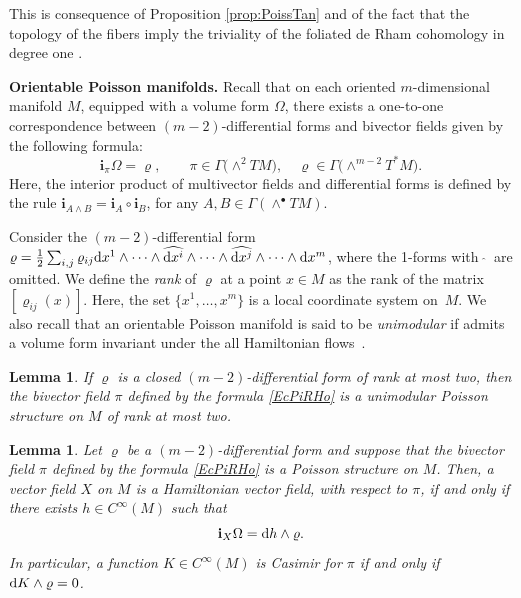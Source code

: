 \documentclass[pdftex]{sigma}%
\newcommand{\dd}{{\rm d}}
\newcommand{\ii}{\mathbf{i}}
\numberwithin{equation}{section}
\newtheorem{Lemma}[Theorem]{Lemma}
\begin{document}
This is consequence of Proposition \ref{prop:PoissTan} and of the fact that the topology of the fibers imply the triviality of the foliated de Rham cohomology in degree one \cite[Proposition~7.4]{DazHec-91}.

{\bf Orientable Poisson manifolds.} Recall that on each oriented $m$-dimensional manifold $M$, equipped with a volume form $\Omega$, there exists a one-to-one correspondence between $(m-2)$-differential forms and bivector fields given by the following formula:
 \begin{equation}\label{EcPiRHo}
 \ii_{\pi}\Omega = \varrho, \qquad \pi \in \Gamma\big({\wedge}^{2}TM\big),\quad \varrho \in \Gamma\big({\wedge}^{m-2}T^{\ast}M\big).
 \end{equation}
Here, the interior product of multivector fields and differential forms is defined by the rule $\ii_{A \wedge B} = \ii_{A} \circ \ii_{B}$, for any $A,B \in \Gamma(\wedge^{\bullet}TM)$.

Consider the $(m-2)$-differential form $\varrho = \frac{1}{2} \sum_{i,j} \varrho_{ij}\dd{x^{1}} \wedge \cdots \wedge \widehat{\dd{x^{i}}} \wedge \cdots \wedge \widehat{\dd{x^{j}}} \wedge \cdots \wedge \dd{x^{m}}$, where the 1-forms with $\ \widehat{}\ $ are omitted. We define the \emph{rank} of $\varrho$ at a point $x \in M$ as the rank of the matrix $[\varrho_{ij}(x)]$. Here, the set $\big\{x^{1},\dots,x^{m}\big\}$ is a local coordinate system on~$M$. We also recall that an orientable Poisson manifold is said to be \emph{unimodular} if admits a volume form invariant under the all Hamiltonian flows~\cite{We-97}.

\begin{Lemma}\label{lemma:RhoRank2}
If $\varrho$ is a closed $(m-2)$-differential form of rank at most two, then the bivector field $\pi$ defined by the formula \eqref{EcPiRHo} is a unimodular Poisson structure on $M$ of rank at most two.
\end{Lemma}

\begin{Lemma}\label{lemma:HamRho}
Let $\varrho$ be a $(m-2)$-differential form and suppose that the bivector field $\pi$ defined by the formula \eqref{EcPiRHo} is a Poisson structure on $M$. Then, a vector field $X$ on $M$ is a Hamiltonian vector field, with respect to $\pi$, if and only if there exists $h \in C^{\infty}(M)$ such that
 \begin{equation*}%
 \ii_{X}\Omega = \dd{h} \wedge \varrho.
 \end{equation*}
In particular, a function $K \in C^{\infty}(M)$ is Casimir for $\pi$ if and only if $\dd{K} \wedge \varrho = 0$.
\end{Lemma}
\end{document}
